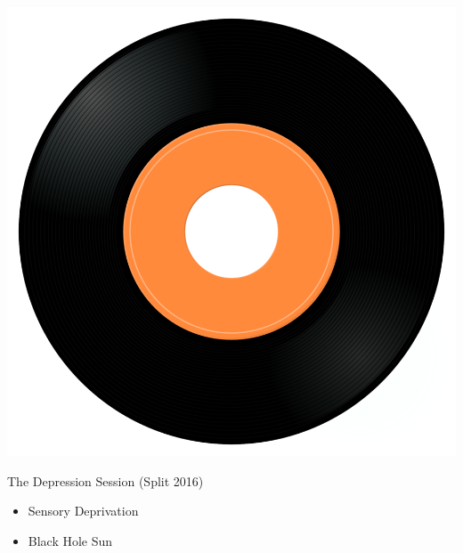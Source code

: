 \begin{minipage}[t]{0.25\textwidth}\vspace{0pt}
\captionsetup{type=figure}
\includegraphics[width=\textwidth]{Images/cover.png}
\caption*{The Depression Session (Split 2016)}
\end{minipage}
\begin{minipage}[t]{0.25\textwidth}\vspace{0pt}
\begin{itemize}[nosep,leftmargin=1em,labelwidth=*,align=left]
	\setlength{\itemsep}{0pt}
	\item Sensory Deprivation
	\item Black Hole Sun
\end{itemize}
\end{minipage}
